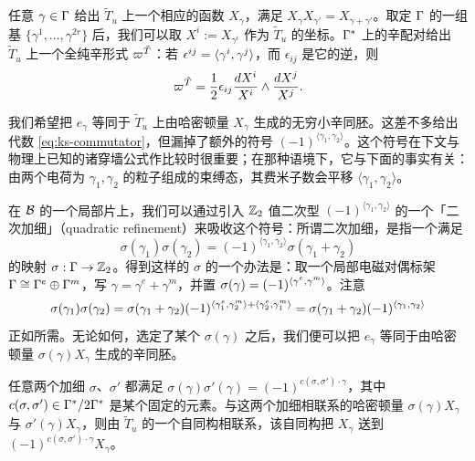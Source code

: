 任意 $\gamma \in \Gamma$ 给出 $\tilde{T}_u$ 上一个相应的函数 $X_\gamma$，满足 $X_\gamma X_{\gamma'} = X_{\gamma + \gamma'}$。取定 $\Gamma$ 的一组基 $\{\gamma^1, \dots, \gamma^{2r}\}$ 后，我们可以取 $X^i := X_{\gamma^i}$ 作为 $\tilde{T}_u$ 的坐标。$\Gamma^*$ 上的辛配对给出 $\tilde{T}_u$ 上一个全纯辛形式 $\varpi^{\tilde{T}}$：若 $\epsilon^{ij} = \langle \gamma^i, \gamma^j \rangle$，而 $\epsilon_{ij}$ 是它的逆，则
\begin{equation}
\varpi^{\tilde{T}} = \frac{1}{2}\epsilon_{ij} \frac{dX^i}{X^i} \wedge \frac{dX^j}{X^j}.
\end{equation}

我们希望把 $e_\gamma$ 等同于 $\tilde{T}_u$ 上由哈密顿量 $X_\gamma$ 生成的无穷小辛同胚。这差不多给出代数 \eqref{eq:ks-commutator}，但漏掉了额外的符号 $(-1)^{\langle \gamma_1,\gamma_2\rangle}$。这个符号在下文与物理上已知的诸穿墙公式作比较时很重要；在那种语境下，它与下面的事实有关：由两个电荷为 $\gamma_1,\gamma_2$ 的粒子组成的束缚态，其费米子数会平移 $\langle \gamma_1,\gamma_2\rangle$。

在 $\mathcal{B}$ 的一个局部片上，我们可以通过引入 $\mathbb{Z}_2$ 值二次型 $(-1)^{\langle \gamma_1,\gamma_2\rangle}$ 的一个「二次加细」（quadratic refinement）来吸收这个符号：所谓二次加细，是指一个满足
\begin{equation}
\sigma(\gamma_1)\sigma(\gamma_2) = (-1)^{\langle \gamma_1,\gamma_2\rangle} \sigma(\gamma_1 + \gamma_2)
\end{equation}
的映射 $\sigma: \Gamma \to \mathbb{Z}_2$。得到这样的 $\sigma$ 的一个办法是：取一个局部电磁对偶标架 $\Gamma \cong \Gamma^e \oplus \Gamma^m$，写 $\gamma = \gamma^e + \gamma^m$，并置 $\sigma(\gamma)=(-1)^{\langle \gamma^e,\gamma^m \rangle}$。注意
\begin{equation}
\sigma(\gamma_1)\sigma(\gamma_2) = \sigma(\gamma_1 + \gamma_2)
(-1)^{\langle \gamma_1^e,\gamma_2^m \rangle + \langle \gamma_2^e,\gamma_1^m \rangle} =
\sigma(\gamma_1 + \gamma_2) (-1)^{\langle \gamma_1,\gamma_2\rangle}
\end{equation}
正如所需。无论如何，选定了某个 $\sigma(\gamma)$ 之后，我们便可以把 $e_\gamma$ 等同于由哈密顿量 $\sigma(\gamma) X_\gamma$ 生成的辛同胚。

任意两个加细 $\sigma$、$\sigma'$ 都满足 $\sigma(\gamma) \sigma'(\gamma) = (-1)^{c(\sigma, \sigma') \cdot \gamma}$，其中 $c(\sigma, \sigma') \in \Gamma^* / 2 \Gamma^*$ 是某个固定的元素。与这两个加细相联系的哈密顿量 $\sigma(\gamma) X_\gamma$ 与 $\sigma'(\gamma) X_\gamma$，则由 $\tilde{T}_u$ 的一个自同构相联系，该自同构把 $X_\gamma$ 送到 $(-1)^{c(\sigma, \sigma') \cdot \gamma} X_\gamma$。

